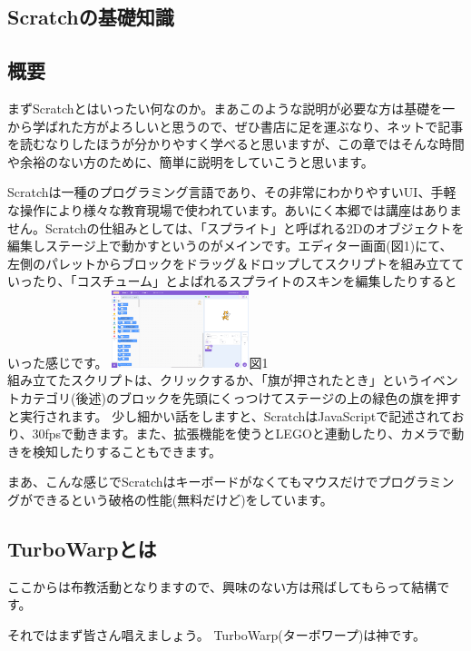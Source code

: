 \documentclass[b5paper,10pt]{jsarticle}
\begin{document}
\begin{multicols*}{3}
\section{Scratchの基礎知識}
\subsection{概要}
まずScratchとはいったい何なのか。まあこのような説明が必要な方は基礎を一から学ばれた方がよろしいと思うので、ぜひ書店に足を運ぶなり、ネットで記事を読むなりしたほうが分かりやすく学べると思いますが、この章ではそんな時間や余裕のない方のために、簡単に説明をしていこうと思います。

Scratchは一種のプログラミング言語であり、その非常にわかりやすいUI、手軽な操作により様々な教育現場で使われています。あいにく本郷では講座はありません。Scratchの仕組みとしては、「スプライト」と呼ばれる2Dのオブジェクトを編集しステージ上で動かすというのがメインです。エディター画面(図1)にて、左側のパレットからブロックをドラッグ＆ドロップしてスクリプトを組み立てていったり、「コスチューム」とよばれるスプライトのスキンを編集したりするといった感じです。
\includegraphics[width=4cm]{editor.png}図1\\
組み立てたスクリプトは、クリックするか、「旗が押されたとき」というイベントカテゴリ(後述)のブロックを先頭にくっつけてステージの上の緑色の旗を押すと実行されます。
少し細かい話をしますと、ScratchはJavaScriptで記述されており、30fpsで動きます。また、拡張機能を使うとLEGOと連動したり、カメラで動きを検知したりすることもできます。

まあ、こんな感じでScratchはキーボードがなくてもマウスだけでプログラミングができるという破格の性能(無料だけど)をしています。
\subsection{TurboWarpとは}
ここからは布教活動となりますので、興味のない方は飛ばしてもらって結構です。

それではまず皆さん唱えましょう。
TurboWarp(ターボワープ)は神です。


\end{multicols*}
\end{document}
